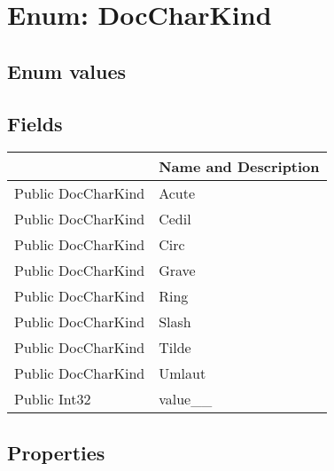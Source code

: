 \documentclass[11pt, oneside, a4paper]{book}
\begin{document}
\hypertarget{SoftwareEngineeringTools.{}Documentation.{}DocCharKind}{}
\section{Enum: DocCharKind}

\subsection{Enum values}

\subsection{Fields}
\begin{center}
\begin{tabular}{| p{3cm} | p{12cm} | }
\hline
\textbf{ } & \textbf{ Name and Description}\\
\hline
 Public  DocCharKind &  Acute\hypertarget{SoftwareEngineeringTools.{}Documentation.{}DocCharKind.{}Acute}{}\\
\hline
 Public  DocCharKind &  Cedil\hypertarget{SoftwareEngineeringTools.{}Documentation.{}DocCharKind.{}Cedil}{}\\
\hline
 Public  DocCharKind &  Circ\hypertarget{SoftwareEngineeringTools.{}Documentation.{}DocCharKind.{}Circ}{}\\
\hline
 Public  DocCharKind &  Grave\hypertarget{SoftwareEngineeringTools.{}Documentation.{}DocCharKind.{}Grave}{}\\
\hline
 Public  DocCharKind &  Ring\hypertarget{SoftwareEngineeringTools.{}Documentation.{}DocCharKind.{}Ring}{}\\
\hline
 Public  DocCharKind &  Slash\hypertarget{SoftwareEngineeringTools.{}Documentation.{}DocCharKind.{}Slash}{}\\
\hline
 Public  DocCharKind &  Tilde\hypertarget{SoftwareEngineeringTools.{}Documentation.{}DocCharKind.{}Tilde}{}\\
\hline
 Public  DocCharKind &  Umlaut\hypertarget{SoftwareEngineeringTools.{}Documentation.{}DocCharKind.{}Umlaut}{}\\
\hline
 Public  Int32 &  value\_\_\hypertarget{SoftwareEngineeringTools.{}Documentation.{}DocCharKind.{}value\_\_}{}\\
\hline
\end{tabular}
\end{center}

\subsection{Properties}
\end{document}
